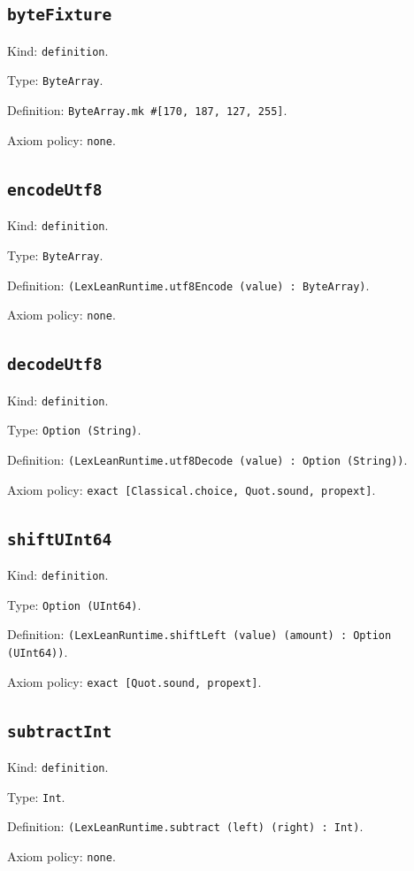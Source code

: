 \documentclass[11pt]{article}
\begin{document}
\subsection*{\texttt{byteFixture}}
\noindent Kind: \texttt{definition}.\par
\noindent Type: \texttt{ByteArray}.\par
\noindent Definition: \texttt{ByteArray.mk \#[170, 187, 127, 255]}.\par
\noindent Axiom policy: \texttt{none}.\par
\subsection*{\texttt{encodeUtf8}}
\noindent Kind: \texttt{definition}.\par
\noindent Type: \texttt{ByteArray}.\par
\noindent Definition: \texttt{(LexLeanRuntime.utf8Encode (value) : ByteArray)}.\par
\noindent Axiom policy: \texttt{none}.\par
\subsection*{\texttt{decodeUtf8}}
\noindent Kind: \texttt{definition}.\par
\noindent Type: \texttt{Option (String)}.\par
\noindent Definition: \texttt{(LexLeanRuntime.utf8Decode (value) : Option (String))}.\par
\noindent Axiom policy: \texttt{exact [Classical.choice, Quot.sound, propext]}.\par
\subsection*{\texttt{shiftUInt64}}
\noindent Kind: \texttt{definition}.\par
\noindent Type: \texttt{Option (UInt64)}.\par
\noindent Definition: \texttt{(LexLeanRuntime.shiftLeft (value) (amount) : Option (UInt64))}.\par
\noindent Axiom policy: \texttt{exact [Quot.sound, propext]}.\par
\subsection*{\texttt{subtractInt}}
\noindent Kind: \texttt{definition}.\par
\noindent Type: \texttt{Int}.\par
\noindent Definition: \texttt{(LexLeanRuntime.subtract (left) (right) : Int)}.\par
\noindent Axiom policy: \texttt{none}.\par
\end{document}
